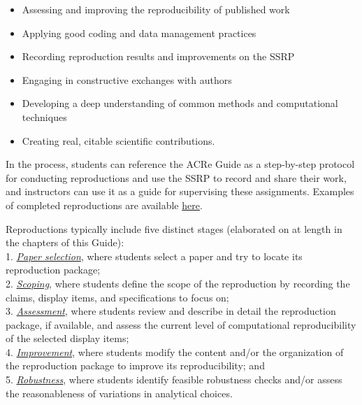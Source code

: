 \documentclass[
  openany]{book}
\providecommand{\tightlist}{%
  \setlength{\itemsep}{0pt}\setlength{\parskip}{0pt}}
\begin{document}
\begin{itemize}
\tightlist
\item
  Assessing and improving the reproducibility of published work\\
\item
  Applying good coding and data management practices\\
\item
  Recording reproduction results and improvements on the SSRP\\
\item
  Engaging in constructive exchanges with authors\\
\item
  Developing a deep understanding of common methods and computational techniques\\
\item
  Creating real, citable scientific contributions.
\end{itemize}

In the process, students can reference the ACRe Guide as a step-by-step protocol for conducting reproductions and use the SSRP to record and share their work, and instructors can use it as a guide for supervising these assignments. Examples of completed reproductions are available \href{https://www.socialsciencereproduction.org/reproductions/search?query=}{here}.

Reproductions typically include five distinct stages (elaborated on at length in the chapters of this Guide):\\
1. \emph{\href{https://bitss.github.io/ACRE/select.html\#select}{Paper selection}}, where students select a paper and try to locate its reproduction package;\\
2. \emph{\href{https://bitss.github.io/ACRE/scoping.html\#scoping}{Scoping}}, where students define the scope of the reproduction by recording the claims, display items, and specifications to focus on;\\
3. \emph{\href{https://bitss.github.io/ACRE/assessment.html\#assessment}{Assessment}}, where students review and describe in detail the reproduction package, if available, and assess the current level of computational reproducibility of the selected display items;\\
4. \emph{\href{https://bitss.github.io/ACRE/improvements.html\#improvements}{Improvement}}, where students modify the content and/or the organization of the reproduction package to improve its reproducibility; and\\
5. \emph{\href{https://bitss.github.io/ACRE/robust.html\#robust}{Robustness}}, where students identify feasible robustness checks and/or assess the reasonableness of variations in analytical choices.
\end{document}
